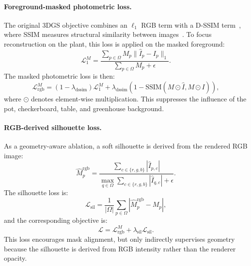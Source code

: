 \documentclass[sigconf]{acmart}
\begin{document}
\paragraph{Foreground-masked photometric loss.}
The original 3DGS objective combines an $\ell_1$ RGB term with a D-SSIM term~\cite{kerbl20233dgaussians}, where SSIM measures structural similarity between images~\cite{wang2004ssim}. To focus reconstruction on the plant, this loss is applied on the masked foreground:
\begin{equation}
\mathcal{L}_{1}^{M}
=
\frac{
\sum_{p \in \Omega} M_p \lVert \hat{I}_p - I_p \rVert_1
}{
\sum_{p \in \Omega} M_p + \epsilon
}.
\end{equation}
The masked photometric loss is then:
\begin{equation}
\mathcal{L}_{\text{rgb}}^{M}
=
(1-\lambda_{\text{dssim}})\mathcal{L}_{1}^{M}
+
\lambda_{\text{dssim}}
\left(
1-\text{SSIM}(M \odot \hat{I}, M \odot I)
\right),
\end{equation}
where $\odot$ denotes element-wise multiplication. This suppresses the influence of the pot, checkerboard, table, and greenhouse background.

\paragraph{RGB-derived silhouette loss.}
As a geometry-aware ablation, a soft silhouette is derived from the rendered RGB image:
\begin{equation}
\hat{M}^{\text{rgb}}_p
=
\frac{
\sum_{c \in \{r,g,b\}} |\hat{I}_{p,c}|
}{
\max_{q \in \Omega} \sum_{c \in \{r,g,b\}} |\hat{I}_{q,c}|+\epsilon
}.
\end{equation}
The silhouette loss is:
\begin{equation}
\mathcal{L}_{\text{sil}}
=
\frac{1}{|\Omega|}
\sum_{p \in \Omega}
\left|
\hat{M}^{\text{rgb}}_p - M_p
\right|,
\end{equation}
and the corresponding objective is:
\begin{equation}
\mathcal{L}
=
\mathcal{L}_{\text{rgb}}^{M}
+
\lambda_{\text{sil}}\mathcal{L}_{\text{sil}}.
\end{equation}
This loss encourages mask alignment, but only indirectly supervises geometry because the silhouette is derived from RGB intensity rather than the renderer opacity.
\end{document}
